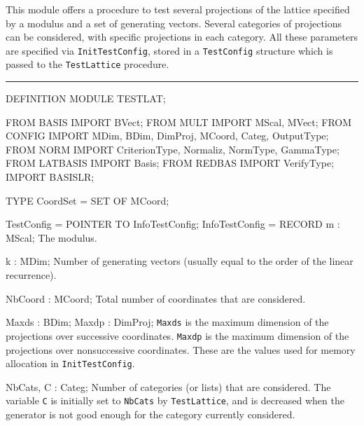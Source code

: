 
This module offers a procedure to test several projections of the lattice specified by a modulus 
and  a set of generating vectors.  Several categories of projections can be considered, with 
specific projections in each category.  All these parameters are specified via 
{\tt InitTestConfig}, stored in a {\tt TestConfig} structure which is passed to the
{\tt TestLattice} procedure.


\bigskip\hrule
\code

DEFINITION MODULE TESTLAT;

FROM BASIS    IMPORT BVect;
FROM MULT     IMPORT MScal, MVect;
FROM CONFIG   IMPORT MDim, BDim, DimProj, MCoord, Categ, OutputType;
FROM NORM     IMPORT CriterionType, Normaliz, NormType, GammaType;
FROM LATBASIS IMPORT Basis;
FROM REDBAS   IMPORT VerifyType;
IMPORT BASISLR;


TYPE
   CoordSet = SET OF MCoord;

   TestConfig = POINTER TO InfoTestConfig;
   InfoTestConfig = RECORD
      m             : MScal;
\endcode
\tabbb
  The modulus.
\endtabbb
\code

      k             : MDim;
\endcode
\tabbb
  Number of generating vectors (usually equal to the order of the
  linear recurrence).
\endtabbb
\code

      NbCoord       : MCoord;
\endcode
\tabbb
  Total number of coordinates that are considered.
\endtabbb
\code

      Maxds         : BDim;
      Maxdp         : DimProj;
\endcode
\tabbb
  {\tt Maxds} is the maximum dimension of the projections over successive 
  coordinates.
  {\tt Maxdp} is the maximum dimension of the projections over nonsuccessive
  coordinates.
  These are the values used for memory allocation in {\tt InitTestConfig}.
\endtabbb
\code

      NbCats, C     : Categ;
\endcode
\tabbb
  Number of categories (or lists) that are considered.
  The variable {\tt C} is initially set to {\tt NbCats} by {\tt TestLattice},
  and is decreased when the generator is not good enough for the 
  category currently considered.
\endtabbb
\code

